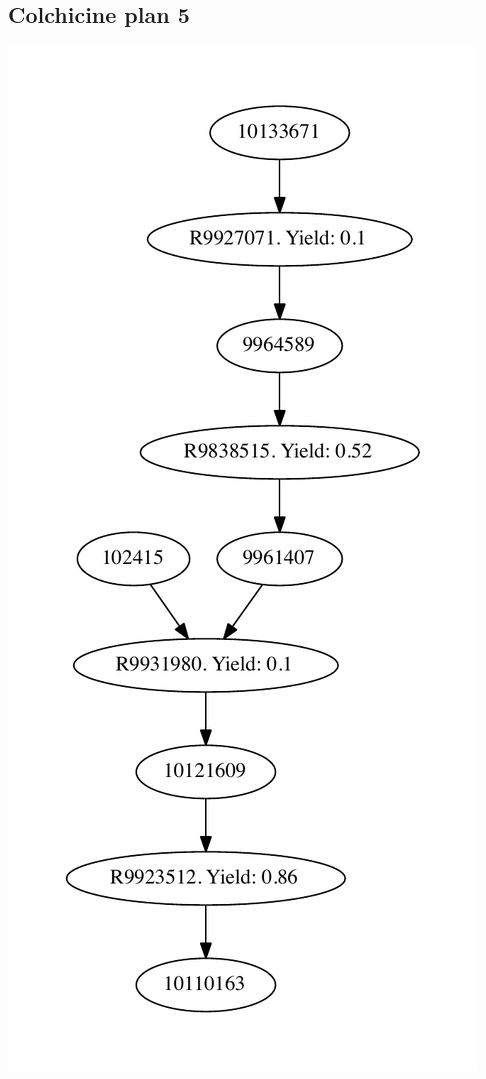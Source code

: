 \documentclass[a4paper,10pt,titlepage]{paper}
\begin{document}
\subsection{Colchicine plan 5}
\centering
\includegraphics[scale=0.4]{Synteseplaner/Colchicine/plan5.pdf}
\label{Appendix::Colchicine5}
\end{document}
